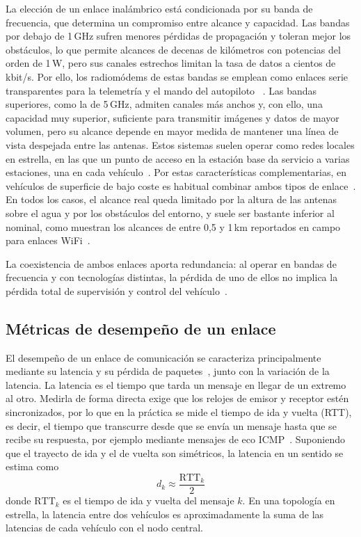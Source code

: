 La elección de un enlace inalámbrico está condicionada por su banda de frecuencia, que
determina un compromiso entre alcance y capacidad. Las bandas por debajo de 1\,GHz
sufren menores pérdidas de propagación y toleran mejor los obstáculos, lo que permite
alcances de decenas de kilómetros con potencias del orden de 1\,W, pero sus canales
estrechos limitan la tasa de datos a cientos de kbit/s. Por ello, los radiomódems de
estas bandas se emplean como enlaces serie transparentes para la telemetría y el mando
del autopiloto~\cite{gogendeau2024} \cite{Cite10}. Las bandas superiores, como la de 5\,GHz,
admiten canales más anchos y, con ello, una capacidad muy superior, suficiente para
transmitir imágenes y datos de mayor volumen, pero su alcance depende en mayor medida de
mantener una línea de vista despejada entre las antenas. Estos sistemas suelen operar
como redes locales en estrella, en las que un punto de acceso en la estación base da
servicio a varias estaciones, una en cada vehículo~\cite{Cite25}. Por estas
características complementarias, en vehículos de superficie de bajo coste es habitual
combinar ambos tipos de enlace~\cite{gogendeau2024}. En todos los casos, el alcance
real queda limitado por la altura de las antenas sobre el agua y por los obstáculos del
entorno, y suele ser bastante inferior al nominal, como muestran los alcances de entre
0,5 y 1\,km reportados en campo para enlaces WiFi~\cite{sears2024}.
 
La coexistencia de ambos enlaces aporta redundancia: al operar en bandas de frecuencia y
con tecnologías distintas, la pérdida de uno de ellos no implica la pérdida total de
supervisión y control del vehículo~\cite{Cite26}.
 
\subsection{Métricas de desempeño de un enlace}
\label{subsec:metricas_enlace}
 
El desempeño de un enlace de comunicación se caracteriza principalmente mediante su
latencia y su pérdida de paquetes~\cite{Cite26}, junto con la variación de la latencia. La latencia es el
tiempo que tarda un mensaje en llegar de un extremo al otro. Medirla de forma directa
exige que los relojes de emisor y receptor estén sincronizados, por lo que en la práctica
se mide el tiempo de ida y vuelta (RTT), es decir, el tiempo que transcurre desde que
se envía un mensaje hasta que se recibe su respuesta, por ejemplo mediante mensajes de
eco ICMP~\cite{Cite26}. Suponiendo que el trayecto de ida y el de vuelta son simétricos,
la latencia en un sentido se estima como
\begin{equation}
  d_{k} \approx \frac{\mathrm{RTT}_{k}}{2}
  \label{eq:latencia_rtt}
\end{equation}
donde $\mathrm{RTT}_{k}$ es el tiempo de ida y vuelta del mensaje $k$. En una topología
en estrella, la latencia entre dos vehículos es aproximadamente la suma de las
latencias de cada vehículo con el nodo central.
 
